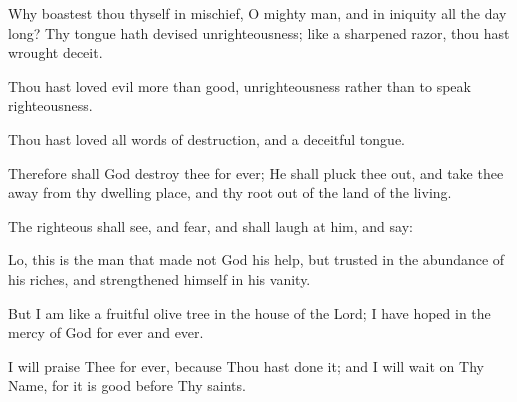 Why boastest thou thyself in mischief, O mighty man, and in iniquity all the day long? Thy tongue hath devised unrighteousness; like a sharpened razor, thou hast wrought deceit.

Thou hast loved evil more than good, unrighteousness rather than to speak righteousness.

Thou hast loved all words of destruction, and a deceitful tongue.

Therefore shall God destroy thee for ever; He shall pluck thee out, and take thee away from thy dwelling place, and thy root out of the land of the living.

The righteous shall see, and fear, and shall laugh at him, and say:

Lo, this is the man that made not God his help, but trusted in the abundance of his riches, and strengthened himself in his vanity.

But I am like a fruitful olive tree in the house of the Lord; I have hoped in the mercy of God for ever and ever.

I will praise Thee for ever, because Thou hast done it; and I will wait on Thy Name, for it is good before Thy saints.
